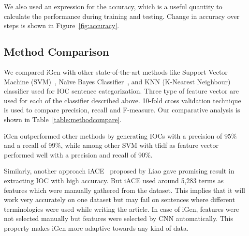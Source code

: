 We also used an expression for the accuracy, which is a useful quantity to calculate the performance during training and testing. Change in accuracy over steps is shown in Figure~\ref{fig:accuracy}.

\subsection{Method Comparison}



We compared iGen with other state-of-the-art methods like Support Vector Machine (SVM)~\cite{cortes}, Na{\"i}ve Bayes Classifier~\cite{nir}, and KNN (K-Nearest Neighbour)~\cite{liao1} classifier used for IOC sentence categorization. Three type of feature vector are used for each of the classifier described above. 10-fold cross validation technique is used to compare precision, recall and F-measure. Our comparative analysis is shown in Table~\ref{table:methodcompare}.

iGen outperformed other methods by generating IOCs with a precision of 95\% and a recall of 99\%, while among other SVM with tfidf as feature vector performed well with a precision and recall of 90\%.

Similarly, another approach iACE~\cite{liao} proposed by Liao gave promising result in extracting IOC with high accuracy. But iACE used around 5,283 terms as features which were manually gathered from the dataset. This implies that it will work very accurately on one dataset but may fail on sentences where different terminologies were used while writing the article. In case of iGen, features were not selected manually but features were selected by CNN automatically. This property makes iGen more adaptive towards any kind of data. 
 

